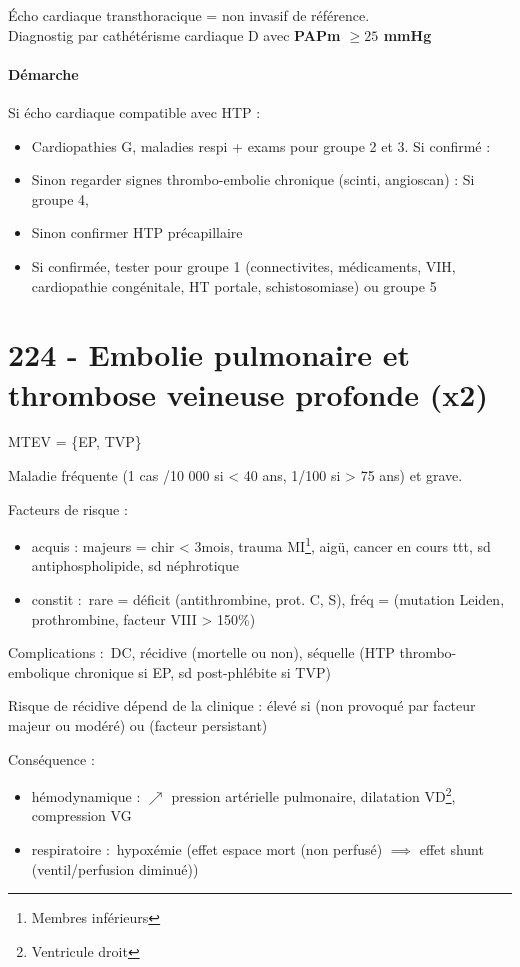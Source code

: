 Écho cardiaque transthoracique = non invasif de référence. \\
Diagnostig par cathétérisme cardiaque D avec \textbf{PAPm $\ge 25$ mmHg}

\paragraph{Démarche}
Si écho cardiaque compatible avec HTP :
\begin{itemize}
\item Cardiopathies G, maladies respi + exams pour groupe 2 et 3. Si confirmé
  : \faHandStopO
\item Sinon regarder signes thrombo-embolie chronique (scinti, angioscan) : Si
  groupe 4, \faHandStopO
\item Sinon confirmer HTP précapillaire 
\item Si confirmée, tester pour groupe 1 (connectivites, médicaments, VIH,
  cardiopathie congénitale, HT portale, schistosomiase) ou groupe 5
\end{itemize}

\section{224 - Embolie pulmonaire et thrombose veineuse profonde (x2)}%
\label{sec:224_embolie_pulmonaire_et_thrombose_veineuse_profonde}
\gls{MTEV} = \{\gls{EP}, \gls{TVP}\}

Maladie fréquente (1 cas /10 000 si < 40 ans, 1/100 si > 75 ans) et grave.

Facteurs de risque :
\begin{itemize}
\item acquis : majeurs = chir < 3mois, trauma MI\footnote{Membres inférieurs},
  \faHospitalO{} aigü, cancer en cours  ttt, sd antiphospholipide, sd
  néphrotique
\item constit : rare = déficit (antithrombine, prot. C, S), fréq = (mutation {Leiden,
    prothrombine}, facteur VIII > 150\%)
\end{itemize}
Complications : DC, récidive (mortelle ou non), séquelle (HTP thrombo-embolique
chronique si EP, sd post-phlébite si TVP)

Risque de récidive dépend de la clinique : élevé si (non provoqué par facteur
majeur ou modéré) ou (\og facteur persistant)

Conséquence :
\begin{itemize}
\item hémodynamique : $\nearrow$ pression artérielle pulmonaire, dilatation
  VD\footnote{Ventricule droit}, compression VG
\item respiratoire : hypoxémie (effet espace mort (non perfusé) $\implies$ effet shunt
  (ventil/perfusion diminué))
\end{itemize}

